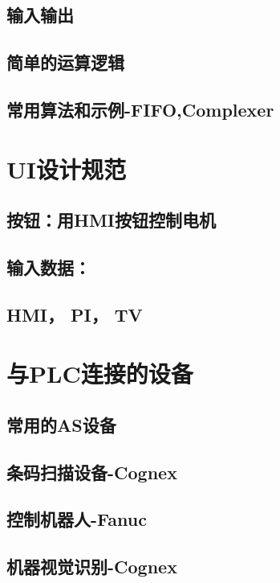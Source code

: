 \documentclass{book}
\begin{document}
	\section{输入输出} \lipsum[22-23]
	\section{简单的运算逻辑} \lipsum[24-25]
	\section{常用算法和示例-FIFO,Complexer} \lipsum[26-27]	
	
    \chapter{UI设计规范	} \lipsum[30-31] %

	\section{按钮：用HMI按钮控制电机} \lipsum[32-33]
	\section{输入数据：} \lipsum[34-35]
	\section{HMI， PI， TV} \lipsum[36-37]		

	
	\chapter{与PLC连接的设备	} \lipsum[40-41] %
	\section{常用的AS设备} \lipsum[42-43]	
	\section{条码扫描设备-Cognex} \lipsum[42-43]
	\section{控制机器人-Fanuc} \lipsum[44-45]
	\section{机器视觉识别-Cognex} \lipsum[46-47]	
\end{document}
